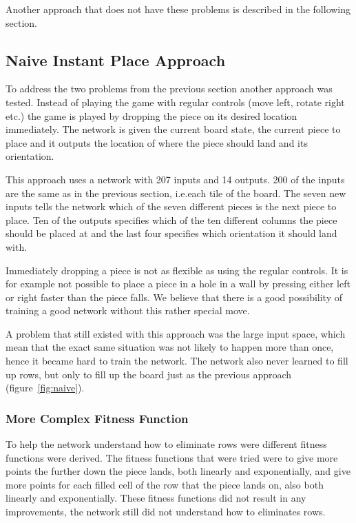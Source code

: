 \documentclass{article}
\begin{document}
Another approach that does not have these problems is described in the following section.

\subsection{Naive Instant Place Approach}

To address the two problems from the previous section another approach was tested. Instead of playing the game with regular controls (move left, rotate right etc.) the game is played by dropping the piece on its desired location immediately. The network is given the current board state, the current piece to place and it outputs the location of where the piece should land and its orientation.

This approach uses a network with 207 inputs and 14 outputs. 200 of the inputs are the same as in the previous section, i.e.\@ each tile of the board. The seven new inputs tells the network which of the seven different pieces is the next piece to place. Ten of the outputs specifies which of the ten different columns the piece should be placed at and the last four specifies which orientation it should land with.

Immediately dropping a piece is not as flexible as using the regular controls. It is for example not possible to place a piece in a hole in a wall by pressing either left or right faster than the piece falls. We believe that there is a good possibility of training a good network without this rather special move.

A problem that still existed with this approach was the large input space, which mean that the exact same situation was not likely to happen more than once, hence it became hard to train the network. The network also never learned to fill up rows, but only to fill up the board just as the previous approach (figure~\ref{fig:naive}).

\subsubsection{More Complex Fitness Function}
To help the network understand how to eliminate rows were different fitness functions were derived. The fitness functions that were tried were to give more points the further down the piece lands, both linearly and exponentially, and give more points for each filled cell of the row that the piece lands on, also both linearly and exponentially. These fitness functions did not result in any improvements, the network still did not understand how to eliminates rows.
\end{document}
